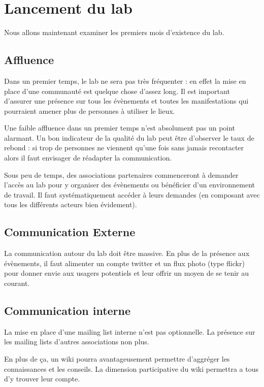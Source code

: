\section{Lancement du lab}

Nous allons maintenant examiner les premiers mois d'existence du lab.

\subsection{Affluence}

Dans un premier temps, le lab ne sera pas très fréquenter : en effet la mise en place d'une communauté est quelque chose
d'assez long. Il est important d'assurer une présence sur tous les évènements et toutes les manifestations qui
pourraient amener plus de personnes à utiliser le lieux.

Une faible affluence dans un premier temps n'est absolument pas un point alarmant. Un bon indicateur de la qualité du
lab peut être d'observer le taux de rebond : si trop de personnes ne viennent qu'une fois sans jamais recontacter alors
il faut envisager de réadapter la communication.

Sous peu de temps, des associations partenaires commenceront à demander l'accès au lab pour y organiser des évènements
ou bénéficier d'un environnement de travail. Il faut systématiquement accéder à leurs demandes (en composant avec
tous les différents acteurs bien évidement).

\subsection{Communication Externe}

La communication autour du lab doit être massive. En plus de la présence aux évènements, il faut alimenter un compte
twitter et un flux photo (type flickr) pour donner envie aux usagers potentiels et leur offrir un moyen de se tenir au
courant.

\subsection{Communication interne}

La mise en place d'une mailing list interne n'est pas optionnelle. La présence sur les mailing lists d'autres
associations non plus.

En plus de ça, un wiki pourra avantageusement permettre d'aggréger les connaissances et les conseils. La dimension
participative du wiki permettra a tous d'y trouver leur compte.


